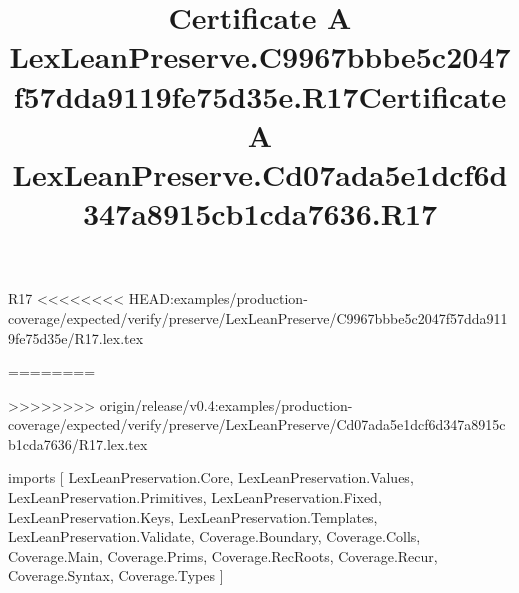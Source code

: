 \begin{lexlean}{R17}
<<<<<<<< HEAD:examples/production-coverage/expected/verify/preserve/LexLeanPreserve/C9967bbbe5c2047f57dda9119fe75d35e/R17.lex.tex
\title{Certificate A LexLeanPreserve.C9967bbbe5c2047f57dda9119fe75d35e.R17}
========
\title{Certificate A LexLeanPreserve.Cd07ada5e1dcf6d347a8915cb1cda7636.R17}
>>>>>>>> origin/release/v0.4:examples/production-coverage/expected/verify/preserve/LexLeanPreserve/Cd07ada5e1dcf6d347a8915cb1cda7636/R17.lex.tex
\begin{coremodule}
imports [
  LexLeanPreservation.Core,
  LexLeanPreservation.Values,
  LexLeanPreservation.Primitives,
  LexLeanPreservation.Fixed,
  LexLeanPreservation.Keys,
  LexLeanPreservation.Templates,
  LexLeanPreservation.Validate,
  Coverage.Boundary,
  Coverage.Colls,
  Coverage.Main,
  Coverage.Prims,
  Coverage.RecRoots,
  Coverage.Recur,
  Coverage.Syntax,
  Coverage.Types
]


\end{coremodule}
\end{lexlean}
